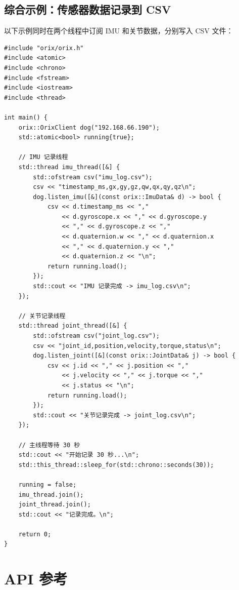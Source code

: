 \documentclass[a4paper,11pt,openany]{book}
\begin{document}
\section{综合示例：传感器数据记录到 CSV}

以下示例同时在两个线程中订阅 IMU 和关节数据，分别写入 CSV 文件：

\begin{lstlisting}[style=cpp]
#include "orix/orix.h"
#include <atomic>
#include <chrono>
#include <fstream>
#include <iostream>
#include <thread>

int main() {
    orix::OrixClient dog("192.168.66.190");
    std::atomic<bool> running{true};

    // IMU 记录线程
    std::thread imu_thread([&] {
        std::ofstream csv("imu_log.csv");
        csv << "timestamp_ms,gx,gy,gz,qw,qx,qy,qz\n";
        dog.listen_imu([&](const orix::ImuData& d) -> bool {
            csv << d.timestamp_ms << ","
                << d.gyroscope.x << "," << d.gyroscope.y
                << "," << d.gyroscope.z << ","
                << d.quaternion.w << "," << d.quaternion.x
                << "," << d.quaternion.y << ","
                << d.quaternion.z << "\n";
            return running.load();
        });
        std::cout << "IMU 记录完成 -> imu_log.csv\n";
    });

    // 关节记录线程
    std::thread joint_thread([&] {
        std::ofstream csv("joint_log.csv");
        csv << "joint_id,position,velocity,torque,status\n";
        dog.listen_joint([&](const orix::JointData& j) -> bool {
            csv << j.id << "," << j.position << ","
                << j.velocity << "," << j.torque << ","
                << j.status << "\n";
            return running.load();
        });
        std::cout << "关节记录完成 -> joint_log.csv\n";
    });

    // 主线程等待 30 秒
    std::cout << "开始记录 30 秒...\n";
    std::this_thread::sleep_for(std::chrono::seconds(30));

    running = false;
    imu_thread.join();
    joint_thread.join();
    std::cout << "记录完成。\n";

    return 0;
}
\end{lstlisting}

\chapter{API 参考}
\label{ch:api}
\end{document}

